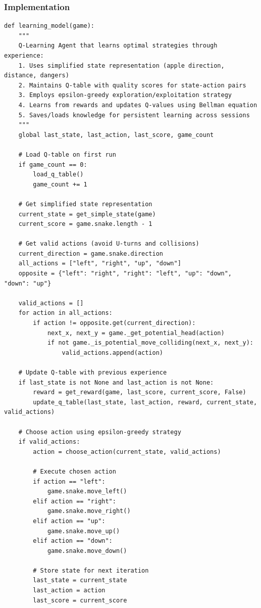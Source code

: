 \documentclass[11pt,a4paper]{article}
\begin{document}
\subsubsection{Implementation}
\begin{lstlisting}[caption=Q-Learning Agent]
def learning_model(game):
    """
    Q-Learning Agent that learns optimal strategies through experience:
    1. Uses simplified state representation (apple direction, distance, dangers)
    2. Maintains Q-table with quality scores for state-action pairs
    3. Employs epsilon-greedy exploration/exploitation strategy
    4. Learns from rewards and updates Q-values using Bellman equation
    5. Saves/loads knowledge for persistent learning across sessions
    """
    global last_state, last_action, last_score, game_count
    
    # Load Q-table on first run
    if game_count == 0:
        load_q_table()
        game_count += 1
    
    # Get simplified state representation
    current_state = get_simple_state(game)
    current_score = game.snake.length - 1
    
    # Get valid actions (avoid U-turns and collisions)
    current_direction = game.snake.direction
    all_actions = ["left", "right", "up", "down"]
    opposite = {"left": "right", "right": "left", "up": "down", "down": "up"}
    
    valid_actions = []
    for action in all_actions:
        if action != opposite.get(current_direction):
            next_x, next_y = game._get_potential_head(action)
            if not game._is_potential_move_colliding(next_x, next_y):
                valid_actions.append(action)
    
    # Update Q-table with previous experience
    if last_state is not None and last_action is not None:
        reward = get_reward(game, last_score, current_score, False)
        update_q_table(last_state, last_action, reward, current_state, valid_actions)
    
    # Choose action using epsilon-greedy strategy
    if valid_actions:
        action = choose_action(current_state, valid_actions)
        
        # Execute chosen action
        if action == "left":
            game.snake.move_left()
        elif action == "right":
            game.snake.move_right()
        elif action == "up":
            game.snake.move_up()
        elif action == "down":
            game.snake.move_down()
        
        # Store state for next iteration
        last_state = current_state
        last_action = action
        last_score = current_score


\end{lstlisting}
\end{document}
